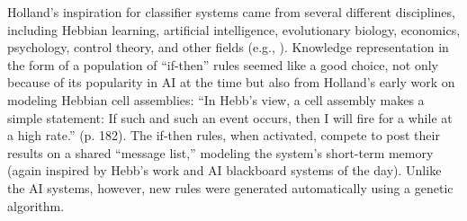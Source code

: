 \documentclass{sig-alternate}
\begin{document}




Holland's inspiration for classifier systems came from several
different disciplines, including Hebbian
learning, artificial intelligence, evolutionary biology, economics,
psychology, control theory, and other fields (e.g.,
\cite{Bellman1961,Samuel1959}).  Knowledge representation in the form of a
population of ``if-then'' rules seemed like a good choice, not only
because of its popularity in AI at the time but also from Holland's
early work on modeling Hebbian cell assemblies: ``In Hebb's view, a
cell assembly makes a simple statement: If such and such an event
occurs, then I will fire for a while at a high
rate.'' \cite{Waldrop1993} (p. 182).  
The if-then rules, when activated, compete to post their results on a
shared ``message list,'' modeling the system's short-term memory
(again inspired by Hebb's work and AI blackboard systems of the day).
Unlike the AI systems, however, new rules were generated automatically
using a genetic algorithm.  
\end{document}
